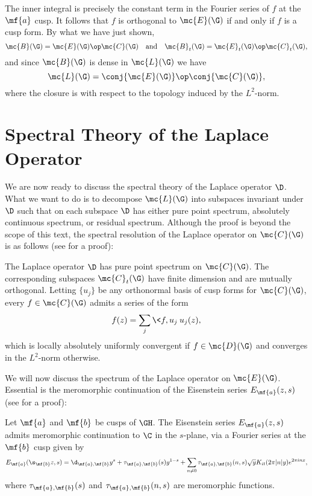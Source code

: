     The inner integral is precisely the constant term in the Fourier series of $f$ at the $\mf{a}$ cusp. It follows that $f$ is orthogonal to $\mc{E}(\G)$ if and only if $f$ is a cusp form. By what we have just shown,
    \[
      \mc{B}(\G) = \mc{E}(\G) \op \mc{C}(\G) \quad \text{and} \quad \mc{B}_{t}(\G) = \mc{E}_{t}(\G) \op \mc{C}_{t}(\G),
    \]
    and since $\mc{B}(\G)$ is dense in $\mc{L}(\G)$ we have
    \[
      \mc{L}(\G) = \conj{\mc{E}(\G)} \op \conj{\mc{C}(\G)},
    \]
    where the closure is with respect to the topology induced by the $L^{2}$-norm.
  \section{Spectral Theory of the Laplace Operator}
    We are now ready to discuss the spectral theory of the Laplace operator $\D$. What we want to do is to decompose $\mc{L}(\G)$ into subspaces invariant under $\D$ such that on each subspace $\D$ has either pure point spectrum, absolutely continuous spectrum, or residual spectrum. Although the proof is beyond the scope of this text, the spectral resolution of the Laplace operator on $\mc{C}(\G)$ is as follows (see \cite{iwaniec2002spectral} for a proof):

    \begin{theorem}\label{thm:cusp_form_spectrum}
      The Laplace operator $\D$ has pure point spectrum on $\mc{C}(\G)$. The corresponding subspaces $\mc{C}_{t}(\G)$ have finite dimension and are mutually orthogonal. Letting $\{u_{j}\}$ be any orthonormal basis of cusp forms for $\mc{C}(\G)$, every $f \in \mc{C}(\G)$ admits a series of the form
      \[
        f(z) = \sum_{j}\<f,u_{j}\>u_{j}(z),
      \]
      which is locally absolutely uniformly convergent if $f \in \mc{D}(\G)$ and converges in the $L^{2}$-norm otherwise.
    \end{theorem}

    We will now discuss the spectrum of the Laplace operator on $\mc{E}(\G)$. Essential is the meromorphic continuation of the Eisenstein series $E_{\mf{a}}(z,s)$ (see \cite{iwaniec2002spectral} for a proof):

    \begin{theorem}\label{thm:meromorphic_continuation_of_Eisenstein_series}
      Let $\mf{a}$ and $\mf{b}$ be cusps of $\GH$. The Eisenstein series $E_{\mf{a}}(z,s)$ admits meromorphic continuation to $\C$ in the $s$-plane, via a Fourier series at the $\mf{b}$ cusp given by
      \[
        E_{\mf{a}}(\s_{\mf{b}}z,s) = \d_{\mf{a},\mf{b}}y^{s}+\tau_{\mf{a},\mf{b}}(s)y^{1-s}+\sum_{n \neq 0}\tau_{\mf{a},\mf{b}}(n,s)\sqrt{y}K_{it}(2\pi|n|y)e^{2\pi inx},
      \]
      where $\tau_{\mf{a},\mf{b}}(s)$ and $\tau_{\mf{a},\mf{b}}(n,s)$ are meromorphic functions.
    \end{theorem}

